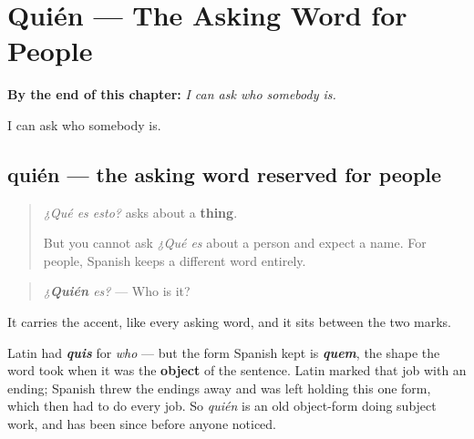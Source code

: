 
\chapter{Quién --- The Asking Word for People}
\label{ch:quien}

\begin{chapteropening}
\textbf{By the end of this chapter:} \emph{I can ask who somebody is.}

I can ask who somebody is.
\end{chapteropening}

\section[quién]{quién — the asking word reserved for people}

\label{lesson:ES-C61-quien}



\begin{quote}
\emph{¿Qué es esto?} asks about a \textbf{thing}.

But you cannot ask \emph{¿Qué es} about a person and expect a name. For people, Spanish keeps a different word entirely.
\end{quote}

\begin{cousinweb}
\begin{quote}
\emph{¿\emph{\textbf{\emph{Quién}} }es?} — Who is it?
\end{quote}

It carries the accent, like every asking word, and it sits between the two marks.

Latin had \emph{\textbf{quis}} for \emph{who} — but the form Spanish kept is \emph{\textbf{quem}}, the shape the word took when it was the \textbf{object} of the sentence. Latin marked that job with an ending; Spanish threw the endings away and was left holding this one form, which then had to do every job. So \emph{quién} is an old object-form doing subject work, and has been since before anyone noticed.
\end{cousinweb}

